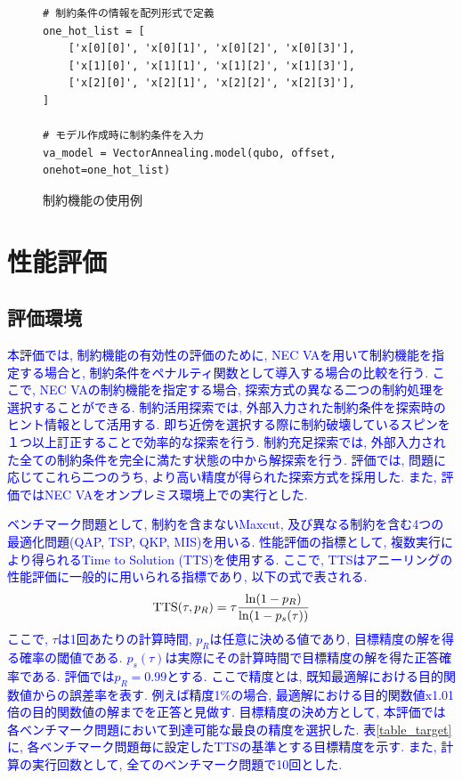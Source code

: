 \documentclass[submit,techrep,noauthor]{ipsj}
\newcounter{sourcecodefigure}
\newcounter{normalfigure}
\newcommand{\switchtosourcecode}{%
    \setcounter{normalfigure}{\value{figure}}
    \setcounter{figure}{\value{sourcecodefigure}}
}
\newcommand{\switchtonormal}{%
    \setcounter{sourcecodefigure}{\value{figure}}
    \setcounter{figure}{\value{normalfigure}}
}
\newcommand\sourcecodeposition{h}
\newenvironment{sourcecode}[1][h]{%
    \begin{figure}[#1]
    \renewcommand\sourcecodeposition{#1}
    \centering
    \captionsetup{name=ソースコード}
    \switchtosourcecode
    \ifthenelse{\equal{\sourcecodeposition}{t}}%
        {\vspace{-1.3zh}} %
        {\ifthenelse{\equal{\sourcecodeposition}{b}}%
            {\vspace{-2zh}} %
            {\vspace{-2zh}} %
    }
}{%
    \ifthenelse{\equal{\sourcecodeposition}{t}}%
        {\vspace{-1.3zh}} %
        {\ifthenelse{\equal{\sourcecodeposition}{b}}%
            {\vspace{-1zh}} %
            {\vspace{-3zh}} %
    }
    \switchtonormal
    \end{figure}
}
\begin{document}
\begin{sourcecode}[h] %
\caption{制約機能の使用例}\label{code:nec_va}
\begin{lstlisting}
# 制約条件の情報を配列形式で定義
one_hot_list = [
    ['x[0][0]', 'x[0][1]', 'x[0][2]', 'x[0][3]'],
    ['x[1][0]', 'x[1][1]', 'x[1][2]', 'x[1][3]'],
    ['x[2][0]', 'x[2][1]', 'x[2][2]', 'x[2][3]'],
]

# モデル作成時に制約条件を入力
va_model = VectorAnnealing.model(qubo, offset, onehot=one_hot_list)
\end{lstlisting}
\vspace{3mm}
\end{sourcecode}

\section{性能評価}

\subsection{評価環境}
\textcolor{blue}{本評価では, 制約機能の有効性の評価のために, NEC VAを用いて制約機能を指定する場合と, 制約条件をペナルティ関数として導入する場合の比較を行う. ここで, NEC VAの制約機能を指定する場合, 探索方式の異なる二つの制約処理を選択することができる. 制約活用探索では, 外部入力された制約条件を探索時のヒント情報として活用する. 即ち近傍を選択する際に制約破壊しているスピンを１つ以上訂正することで効率的な探索を行う. 制約充足探索では, 外部入力された全ての制約条件を完全に満たす状態の中から解探索を行う. 評価では, 問題に応じてこれら二つのうち, より高い精度が得られた探索方式を採用した. また, 評価ではNEC VAをオンプレミス環境上での実行とした.} 


\textcolor{blue}{ベンチマーク問題として, 制約を含まないMaxcut, 及び異なる制約を含む4つの最適化問題(QAP, TSP, QKP, MIS)を用いる. 性能評価の指標として, 複数実行により得られるTime to Solution (TTS)を使用する. ここで, TTSはアニーリングの性能評価に一般的に用いられる指標であり, 以下の式で表される.}
\begin{equation}
{\rm{TTS}}(\tau, p_{R}) = \tau\frac{{\rm{ln}}(1-p_{R})}{{\rm{ln}}(1-p_{s}(\tau))} \label{tts_def}
\end{equation}
\textcolor{blue}{ここで, $\tau$は1回あたりの計算時間, $p_{R}$は任意に決める値であり, 目標精度の解を得る確率の閾値である. $p_{s}(\tau)$は実際にその計算時間で目標精度の解を得た正答確率である. 評価では$p_{R}=0.99$とする. ここで精度とは, 既知最適解における目的関数値からの誤差率を表す. 例えば精度1\%の場合, 最適解における目的関数値x1.01倍の目的関数値の解までを正答と見做す. 目標精度の決め方として, 本評価では各ベンチマーク問題において到達可能な最良の精度を選択した. 表\ref{table_target}に, 各ベンチマーク問題毎に設定したTTSの基準とする目標精度を示す. また, 計算の実行回数として, 全てのベンチマーク問題で10回とした.}
\end{document}

